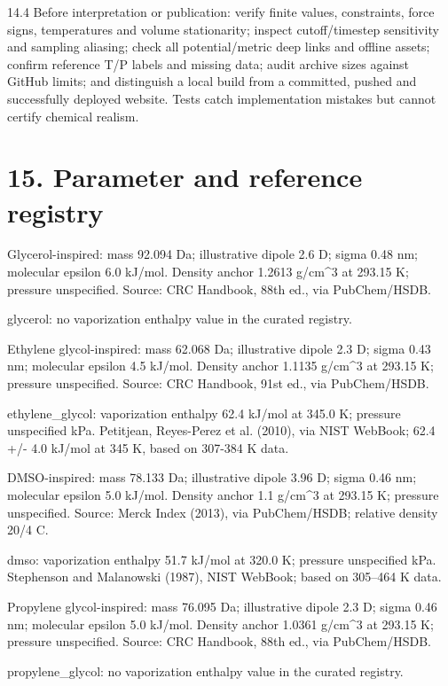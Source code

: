 \documentclass[11pt]{article}
\begin{document}
14.4 Before interpretation or publication: verify finite values, constraints, force signs, temperatures and volume stationarity; inspect cutoff/timestep sensitivity and sampling aliasing; check all potential/metric deep links and offline assets; confirm reference T/P labels and missing data; audit archive sizes against GitHub limits; and distinguish a local build from a committed, pushed and successfully deployed website. Tests catch implementation mistakes but cannot certify chemical realism.


\section*{15. Parameter and reference registry}
Glycerol-inspired: mass 92.094 Da; illustrative dipole 2.6 D; sigma 0.48 nm; molecular epsilon 6.0 kJ/mol. Density anchor 1.2613 g/cm\textasciicircum{}3 at 293.15 K; pressure unspecified. Source: CRC Handbook, 88th ed., via PubChem/HSDB.


glycerol: no vaporization enthalpy value in the curated registry.


Ethylene glycol-inspired: mass 62.068 Da; illustrative dipole 2.3 D; sigma 0.43 nm; molecular epsilon 4.5 kJ/mol. Density anchor 1.1135 g/cm\textasciicircum{}3 at 293.15 K; pressure unspecified. Source: CRC Handbook, 91st ed., via PubChem/HSDB.


ethylene\_glycol: vaporization enthalpy 62.4 kJ/mol at 345.0 K; pressure unspecified kPa. Petitjean, Reyes-Perez et al. (2010), via NIST WebBook; 62.4 +/- 4.0 kJ/mol at 345 K, based on 307-384 K data.


DMSO-inspired: mass 78.133 Da; illustrative dipole 3.96 D; sigma 0.46 nm; molecular epsilon 5.0 kJ/mol. Density anchor 1.1 g/cm\textasciicircum{}3 at 293.15 K; pressure unspecified. Source: Merck Index (2013), via PubChem/HSDB; relative density 20/4 C.


dmso: vaporization enthalpy 51.7 kJ/mol at 320.0 K; pressure unspecified kPa. Stephenson and Malanowski (1987), NIST WebBook; based on 305–464 K data.


Propylene glycol-inspired: mass 76.095 Da; illustrative dipole 2.3 D; sigma 0.46 nm; molecular epsilon 5.0 kJ/mol. Density anchor 1.0361 g/cm\textasciicircum{}3 at 293.15 K; pressure unspecified. Source: CRC Handbook, 88th ed., via PubChem/HSDB.


propylene\_glycol: no vaporization enthalpy value in the curated registry.
\end{document}
